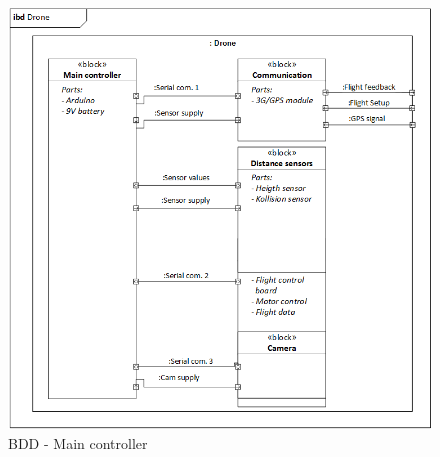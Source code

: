 \begin{figure}[H]
\centering
\includegraphics[scale=0.8]{Billeder/test2.png}
\caption{BDD - Main controller}
\label{fig:bdd_maincontroller}
\end{figure}


